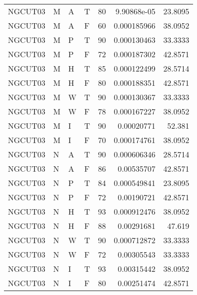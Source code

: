 \begin{tabular}{llllrrr}
    NGCUT03  & M     & A     & T          & 80         & 9.90868e-05 & 23.8095  \\
    NGCUT03  & M     & A     & F          & 60         & 0.000185966 & 38.0952  \\
    NGCUT03  & M     & P     & T          & 90         & 0.000130463 & 33.3333  \\
    NGCUT03  & M     & P     & F          & 72         & 0.000187302 & 42.8571  \\
    NGCUT03  & M     & H     & T          & 85         & 0.000122499 & 28.5714  \\
    NGCUT03  & M     & H     & F          & 80         & 0.000188351 & 42.8571  \\
    NGCUT03  & M     & W     & T          & 90         & 0.000130367 & 33.3333  \\
    NGCUT03  & M     & W     & F          & 78         & 0.000167227 & 38.0952  \\
    NGCUT03  & M     & I     & T          & 90         & 0.00020771  & 52.381   \\
    NGCUT03  & M     & I     & F          & 70         & 0.000174761 & 38.0952  \\
    NGCUT03  & N     & A     & T          & 90         & 0.000606346 & 28.5714  \\
    NGCUT03  & N     & A     & F          & 86         & 0.00535707  & 42.8571  \\
    NGCUT03  & N     & P     & T          & 84         & 0.000549841 & 23.8095  \\
    NGCUT03  & N     & P     & F          & 72         & 0.00190721  & 42.8571  \\
    NGCUT03  & N     & H     & T          & 93         & 0.000912476 & 38.0952  \\
    NGCUT03  & N     & H     & F          & 88         & 0.00291681  & 47.619   \\
    NGCUT03  & N     & W     & T          & 90         & 0.000712872 & 33.3333  \\
    NGCUT03  & N     & W     & F          & 72         & 0.00305543  & 33.3333  \\
    NGCUT03  & N     & I     & T          & 93         & 0.00315442  & 38.0952  \\
    NGCUT03  & N     & I     & F          & 80         & 0.00251474  & 42.8571  \\
    \hline
\end{tabular}